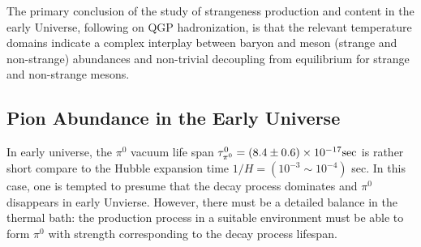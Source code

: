 \documentclass[universe,article,submit,moreauthors,pdftex,a4paper]{Definitions/mdpi}
\begin{document}
The primary conclusion of the study of strangeness production and content in the early Universe, following on QGP hadronization, is that the relevant temperature domains indicate a complex interplay between baryon and meson (strange and non-strange) abundances and non-trivial decoupling from equilibrium for strange and non-strange mesons.



\subsection{Pion Abundance in the Early Universe}\label{sec:Pions}
\noindent 
In early universe, the $\pi^0$ vacuum life span $\tau_{\pi^0}^0=(8.4\pm0.6)\times10^{-17} {\rm sec}$ is rather short compare to the Hubble expansion time $1/H=(10^{-3}\sim10^{-4})$ sec. In this case, one is tempted to presume that the decay process dominates and $\pi^0$ disappears in early Unvierse. However, there must be a detailed balance in the thermal bath: the production process in a suitable environment must be able to form $\pi^0$ with strength corresponding to the decay process lifespan. 
\end{document}
